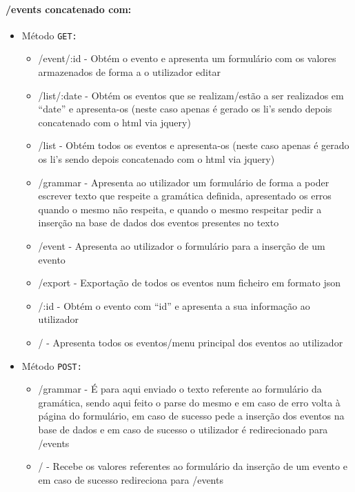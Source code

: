 \paragraph{/events concatenado com:}
        \begin{itemize}
            \item Método \texttt{GET:}
                \begin{itemize}
                    \item /event/:id - Obtém o evento e apresenta um formulário com os valores armazenados de forma a o utilizador editar
                    \item /list/:date - Obtém os eventos que se realizam/estão a ser realizados em ``date'' e apresenta-os (neste caso apenas é gerado os li's sendo depois concatenado com o html via jquery)
                    \item /list - Obtém todos os eventos e apresenta-os (neste caso apenas é gerado os li's sendo depois concatenado com o html via jquery)
                    \item /grammar - Apresenta ao utilizador um formulário de forma a poder escrever texto que respeite a gramática definida, apresentado os erros quando o mesmo não respeita, e quando o mesmo respeitar pedir a inserção na base de dados dos eventos presentes no texto
                    \item /event - Apresenta ao utilizador o formulário para a inserção de um evento
                    \item /export - Exportação de todos os eventos num ficheiro em formato json
                    \item /:id - Obtém o evento com ``id'' e apresenta a sua informação ao utilizador
                    \item / - Apresenta todos os eventos/menu principal dos eventos ao utilizador
                \end{itemize}
            \item Método \texttt{POST:}
                \begin{itemize}
                    \item /grammar - É para aqui enviado o texto referente ao formulário da gramática, sendo aqui feito o parse do mesmo e em caso de erro volta à página do formulário, em caso de sucesso pede a inserção dos eventos na base de dados e em caso de sucesso o utilizador é redirecionado para /events
                    \item / - Recebe os valores referentes ao formulário da inserção de um evento e em caso de sucesso redireciona para /events

\end{itemize}
\end{itemize}

